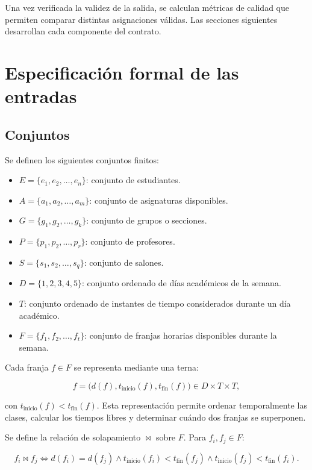 \documentclass[11pt]{article}
\numberwithin{equation}{section}
\numberwithin{figure}{section}
\numberwithin{table}{section}
\theoremstyle{definition}
\begin{document}
Una vez verificada la validez de la salida, se calculan métricas de calidad que
permiten comparar distintas asignaciones válidas. Las secciones siguientes
desarrollan cada componente del contrato.

\section{Especificación formal de las entradas}

\subsection{Conjuntos}

Se definen los siguientes conjuntos finitos:

\begin{itemize}
  \item $E = \{e_1,e_2,\ldots,e_n\}$: conjunto de estudiantes.
  \item $A = \{a_1,a_2,\ldots,a_m\}$: conjunto de asignaturas disponibles.
  \item $G = \{g_1,g_2,\ldots,g_k\}$: conjunto de grupos o secciones.
  \item $P = \{p_1,p_2,\ldots,p_r\}$: conjunto de profesores.
  \item $S = \{s_1,s_2,\ldots,s_q\}$: conjunto de salones.
  \item $D = \{1,2,3,4,5\}$: conjunto ordenado de días académicos de la
        semana.
  \item $T$: conjunto ordenado de instantes de tiempo considerados durante
        un día académico.
  \item $F = \{f_1,f_2,\ldots,f_t\}$: conjunto de franjas horarias
        disponibles durante la semana.
\end{itemize}

Cada franja $f\in F$ se representa mediante una terna:

\[
f=\bigl(d(f),t_{\mathrm{inicio}}(f),t_{\mathrm{fin}}(f)\bigr)
\in D\times T\times T,
\]

con $t_{\mathrm{inicio}}(f)<t_{\mathrm{fin}}(f)$. Esta representación permite
ordenar temporalmente las clases, calcular los tiempos libres y determinar
cuándo dos franjas se superponen.

Se define la relación de solapamiento $\bowtie$ sobre $F$. Para
$f_i,f_j\in F$:

\[
f_i\bowtie f_j
\iff
d(f_i)=d(f_j)
\land
t_{\mathrm{inicio}}(f_i)<t_{\mathrm{fin}}(f_j)
\land
t_{\mathrm{inicio}}(f_j)<t_{\mathrm{fin}}(f_i).
\]
\end{document}
